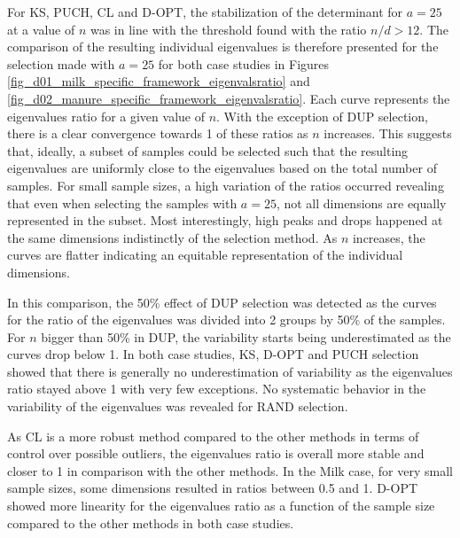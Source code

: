 \documentclass[journal=ancham,manuscript=article]{achemso}
\begin{document}
For KS, PUCH, CL and D-OPT, the stabilization of the determinant for $a=25$ at a value of $n$ was in line with the threshold found with the ratio $n/d>12$. The comparison of the resulting individual eigenvalues is therefore presented for the selection made with $a = 25$ for both case studies in Figures \ref{fig_d01_milk_specific_framework_eigenvalsratio} and \ref{fig_d02_manure_specific_framework_eigenvalsratio}. Each curve represents the eigenvalues ratio for a given value of $n$. With the exception of DUP selection, there is a clear convergence towards 1 of these ratios as $n$ increases. This suggests that, ideally, a subset of samples could be selected such that the resulting eigenvalues are uniformly close to the eigenvalues based on the total number of samples. For small sample sizes, a high variation of the ratios occurred revealing that even when selecting the samples with $a=25$, not all dimensions are equally represented in the subset. Most interestingly, high peaks and drops happened at the same dimensions indistinctly of the selection method. As $n$ increases, the curves are flatter indicating an equitable representation of the individual dimensions. 

In this comparison, the 50\% effect of DUP selection was detected as the curves for the ratio of the eigenvalues was divided into 2 groups by 50\% of the samples. For $n$ bigger than 50\% in DUP, the variability starts being underestimated as the curves drop below 1. In both case studies, KS, D-OPT and PUCH selection showed that there is generally no underestimation of variability as the eigenvalues ratio stayed above 1 with very few exceptions. No systematic behavior in the variability of the eigenvalues was revealed for RAND selection. 

As CL is a more robust method compared to the other methods in terms of control over possible outliers, the eigenvalues ratio is overall more stable and closer to 1 in comparison with the other methods. In the Milk case, for very small sample sizes, some dimensions resulted in ratios between 0.5 and 1. D-OPT showed more linearity for the eigenvalues ratio as a function of the sample size compared to the other methods in both case studies. 
\end{document}
